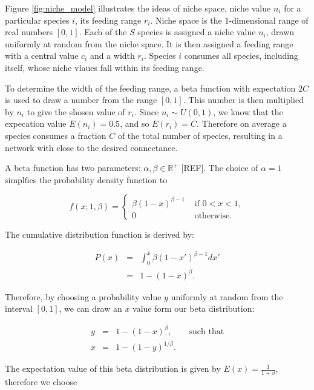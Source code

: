 Figure \ref{fig:niche_model} illustrates the ideas of niche space, niche value $n_i$ for a particular species $i$, its feeding range $r_i$. Niche space is the 1-dimensional range of real numbers $[0,1]$. Each of the $S$ species is assigned a niche value $n_i$, drawn uniformly at random from the niche space. It is then assigned a feeding range with a central value $c_i$ and a width $r_i$. Species $i$ consumes all species, including itself, whose niche vlaues fall within its feeding range.

To determine the width of the feeding range, a beta function  with expectation $2C$ is used to draw a number from the range $[0,1]$. This number is then multiplied by $n_i$ to give the shosen value of $r_i$.  Since $n_i \sim U(0,1)$, we know that the expecation value $E(n_i) = 0.5$, and so $E(r_i) = C$. Therefore on average a species consumes a fraction $C$ of the total number of species, resulting in a network with close to the desired connectance.  


A beta function has two parameters: $\alpha, \beta \in \mathbb{R^+}$ [REF]. The choice of $\alpha = 1$ simplfies the probability density function to

\begin{equation*}
f (x; 1,\beta) = \begin{cases}
\beta (1-x)^{\beta - 1} &\mbox{ if } 0 < x < 1,  \\
0	                    &\mbox{ otherwise. }
\end{cases}
\label{eq:beta_pdf}
\end{equation*}

The cumulative distribution function is derived by:

\begin{eqnarray*}
P(x) &=& \int_{0}^{x} \beta (1-x')^{\beta - 1} dx' \\
     &=& 1 - (1-x)^\beta . 
\label{eq:beta_cdf}                         
\end{eqnarray*}

Therefore, by choosing a probability value $y$ uniformly at random from the interval $[0,1]$, we can draw an $x$ value form our beta distribution:
 
\begin{eqnarray*}
y &=&  1 - (1-x)^\beta, \qquad \text{such that} \\[5pt]
x &=&  1 - (1- y)^{1/\beta}.                          
\label{eq:beta_sampling}
\end{eqnarray*}

The expectation value of this beta distribution is given by $E (x) = \frac{1}{1 + \beta}$, therefore we choose

